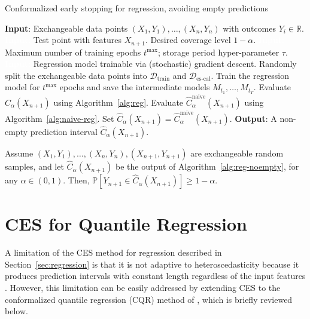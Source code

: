 \begin{algorithm}[H]
    \caption{Conformalized early stopping for regression, avoiding empty predictions}
    \label{alg:reg-noempty}
    \begin{algorithmic}[1]
        \STATE \textbf{Input}: Exchangeable data points $(X_{1},Y_{1}), \ldots, (X_{n},Y_{n})$ with outcomes $Y_i \in \mathbb{R}$.
        \STATE \textcolor{white}{\textbf{Input}:} Test point with features $X_{n+1}$. Desired coverage level $1-\alpha$.
        \STATE \textcolor{white}{\textbf{Input}:} Maximum number of training epochs $t^{\text{max}}$; storage period hyper-parameter $\tau$.
        \STATE \textcolor{white}{\textbf{Input}:} Regression model trainable via (stochastic) gradient descent.
        \STATE Randomly split the exchangeable data points into $\mathcal{D}_{\text{train}}$ and $\mathcal{D}_{\text{es-cal}}$.
        \STATE Train the regression model for $t^{\text{max}}$ epochs and save the intermediate models $M_{t_1} , \dots, M_{t_T}$.
        \STATE Evaluate $\hat{C}_{\alpha}(X_{n+1})$ using Algorithm~\ref{alg:reg}.
        \STATE Evaluate $\hat{C}^{\text{naive}}_{\alpha}(X_{n+1})$ using Algorithm~\ref{alg:naive-reg}. Set $\hat{C}_{\alpha}(X_{n+1}) = \hat{C}^{\text{naive}}_{\alpha}(X_{n+1})$.
        \ENDIF
        \STATE \textbf{Output}: A non-empty prediction interval $\hat{C}_{\alpha}(X_{n+1})$.
    \end{algorithmic}
\end{algorithm}

\begin{corollary}\label{thm:reg-noempty}
Assume $(X_{1},Y_{1}), \ldots, (X_{n},Y_{n}), (X_{n+1},Y_{n+1})$ are exchangeable random samples, and let $\hat{C}_{\alpha}(X_{n+1})$ be the output of Algorithm~\ref{alg:reg-noempty}, for any $\alpha \in (0,1)$. 
Then, $\mathbb{P}[Y_{n+1} \in \hat{C}_{\alpha}(X_{n+1})] \geq 1-\alpha$.
\end{corollary}


\section{CES for Quantile Regression} \label{sec:quantile-regression}

A limitation of the CES method for regression described in Section~\ref{sec:regression} is that it is not adaptive to heteroscedasticity because it produces prediction intervals with constant length regardless of the input features \cite{romano2019conformalized}.
However, this limitation can be easily addressed by extending CES to the conformalized quantile regression (CQR) method of \citet{romano2019conformalized}, which is briefly reviewed below.

